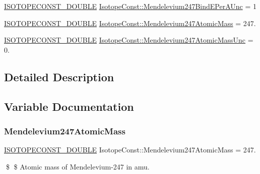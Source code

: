 \begin{DoxyCompactItemize}
\item 
\mbox{\hyperlink{group___isotope_const-_macros_ga8f45a7272ce02c0b4c65c44636ed719a}{I\+S\+O\+T\+O\+P\+E\+C\+O\+N\+S\+T\+\_\+\+D\+O\+U\+B\+LE}} \mbox{\hyperlink{group___isotope_const-_mendelevium-_md247_ga63266d8a7755da85339aaa78492bfd32}{Isotope\+Const\+::\+Mendelevium247\+Bind\+E\+Per\+A\+Unc}} = 1
\item 
\mbox{\hyperlink{group___isotope_const-_macros_ga8f45a7272ce02c0b4c65c44636ed719a}{I\+S\+O\+T\+O\+P\+E\+C\+O\+N\+S\+T\+\_\+\+D\+O\+U\+B\+LE}} \mbox{\hyperlink{group___isotope_const-_mendelevium-_md247_gaba6200de39855f6774df3b5566974451}{Isotope\+Const\+::\+Mendelevium247\+Atomic\+Mass}} = 247.
\item 
\mbox{\hyperlink{group___isotope_const-_macros_ga8f45a7272ce02c0b4c65c44636ed719a}{I\+S\+O\+T\+O\+P\+E\+C\+O\+N\+S\+T\+\_\+\+D\+O\+U\+B\+LE}} \mbox{\hyperlink{group___isotope_const-_mendelevium-_md247_ga51ca09c874e5e328bb87aae4a3aaceb4}{Isotope\+Const\+::\+Mendelevium247\+Atomic\+Mass\+Unc}} = 0.
\end{DoxyCompactItemize}


\subsection{Detailed Description}


\subsection{Variable Documentation}
\mbox{\label{group___isotope_const-_mendelevium-_md247_gaba6200de39855f6774df3b5566974451}} 
\subsubsection{\texorpdfstring{Mendelevium247\+Atomic\+Mass}{Mendelevium247AtomicMass}}
{\footnotesize\ttfamily \mbox{\hyperlink{group___isotope_const-_macros_ga8f45a7272ce02c0b4c65c44636ed719a}{I\+S\+O\+T\+O\+P\+E\+C\+O\+N\+S\+T\+\_\+\+D\+O\+U\+B\+LE}} Isotope\+Const\+::\+Mendelevium247\+Atomic\+Mass = 247.}

\$ \$ Atomic mass of Mendelevium-\/247 in amu. \mbox{\label{group___isotope_const-_mendelevium-_md247_ga51ca09c874e5e328bb87aae4a3aaceb4}} 
